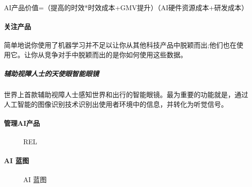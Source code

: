 \documentclass[letterpaper,11pt,english]{sphinxmanual}
\begin{document}
AI产品价值=（提高的时效*时效成本+GMV提升）\sphinxhyphen{}（AI硬件资源成本+研发成本）


\paragraph{关注产品}
\label{\detokenize{chapter_introduction/AI_Product:id8}}
简单地说你使用了机器学习并不足以让你从其他科技产品中脱颖而出;他们也在使用它。让你从竞争对手中脱颖而出的是你如何使用这些数据。
%
\begin{footnote}[209]\sphinxAtStartFootnote
{}
%
\end{footnote}


\subparagraph{辅助视障人士的天使眼智能眼镜}
\label{\detokenize{chapter_introduction/AI_Product:id9}}
世界上首款辅助视障人士感知世界和出行的智能眼镜。最为重要的功能就是，通过人工智能的图像识别技术识别出使用者环境中的信息，并转化为听觉信号。
%
\begin{footnote}[210]\sphinxAtStartFootnote
{}
%
\end{footnote}


\paragraph{管理AI产品}
\label{\detokenize{chapter_introduction/AI_Product:id10}}
\begin{figure}[H]
\centering
\capstart

\noindent{}
\caption{REL}\label{\detokenize{chapter_introduction/AI_Product:id20}}\end{figure}


\paragraph{AI 蓝图}
\label{\detokenize{chapter_introduction/AI_Product:id11}}
\begin{figure}[H]
\centering
\capstart

\noindent{}
\caption{AI
蓝图\sphinxfootnotemark[211]}\label{\detokenize{chapter_introduction/AI_Product:id21}}\end{figure}
%
\begin{footnotetext}[211]\sphinxAtStartFootnote
{}
%
\end{footnotetext}\ignorespaces 
\end{document}
